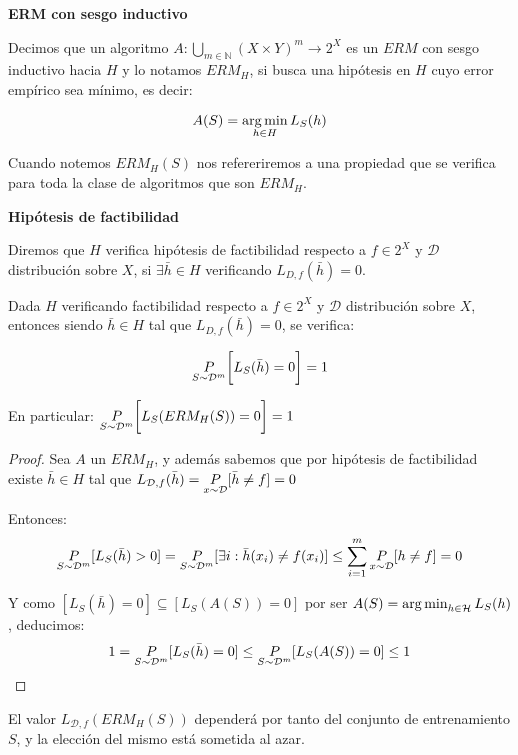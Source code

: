 \begin{definition} \textbf{ERM con sesgo inductivo}

Decimos que un algoritmo $A: \underset{m\in \mathbb{N}}{\bigcup} (X\times Y)^m \rightarrow 2^{X}$ es un $ERM$ con sesgo 
inductivo hacia $H$ y lo notamos $ERM_H$, si busca una hipótesis en $H$ cuyo error empírico 
sea mínimo, es decir:

\[A(S) = \operatorname*{arg\,min}_{h\in H} L_S(h)\]
\end{definition}

Cuando notemos $ERM_H(S)$ nos refereriremos a una propiedad que se verifica para toda la clase de algoritmos que 
son $ERM_H$.

\begin{definition} \textbf{Hipótesis de factibilidad}

Diremos que $H$ verifica hipótesis de factibilidad respecto a $f\in 2^X$ y $\mathcal{D}$ distribución sobre $X$, si 
$\exists {\bar{h}} \in H$ verificando $L_{D,f}(\bar{h}) = 0$.
\end{definition}

\begin{fact}
Dada $H$ verificando factibilidad respecto a $f\in 2^X$ y $\mathcal{D}$ distribución sobre $X$, entonces siendo 
${\bar{h}} \in H$ tal que $L_{D,f}(\bar{h}) = 0$, se verifica:

\[\underset{S\sim \mathcal{D}^m}{P} \bigg[L_S(\bar{h}) = 0 \bigg] = 1\]

En particular: $\underset{S\sim \mathcal{D}^m}{P} \bigg[L_S(ERM_H(S)) = 0 \bigg] = 1$
\label{fact:ermh}
\end{fact}

  \begin{proof}
  Sea $A$ un $ERM_H$, y además sabemos que por hipótesis de factibilidad existe $\bar{h} \in H$ tal que
  $L_{\mathcal{D},f}(\bar{h}) = \underset{x\sim \mathcal{D}}{P}[\bar{h}\neq f] = 0$

  Entonces: \[\underset{S\sim \mathcal{D}^m}{P}[L_S(\bar{h}) > 0] = \underset{S\sim \mathcal{D}^m}{P}
  [\exists i: \bar{h}(x_i) \neq f(x_i)] \le \sum_{i=1}^m \underset{x\sim \mathcal{D}}{P}[h\neq f] = 0\]

  Y como $[L_S(\bar{h}) = 0] \subseteq [L_S(A(S)) = 0]$ por ser $A(S) = \operatorname*{arg\,min}_{h\in \mathcal{H}} L_S(h)$, deducimos:
  \[1 = \underset{S\sim \mathcal{D}^m}{P}[L_S(\bar{h}) = 0] \le \underset{S\sim \mathcal{D}^m}{P}[L_S(A(S)) = 0] \le 1\]
  \end{proof}

El valor $L_{\mathcal{D},f}(ERM_H(S))$ dependerá por tanto del conjunto de entrenamiento $S$, y la elección del
mismo está sometida al azar. 

